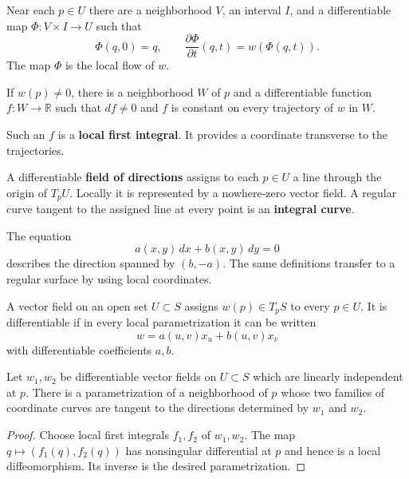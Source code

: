 \documentclass[12pt, oneside]{book}
\begin{document}
\begin{theorem}
    Near each $p\in U$ there are a neighborhood $V$, an interval $I$, and a
    differentiable map $\Phi:V\times I\rightarrow U$ such that
    \[
        \Phi(q,0)=q,
        \qquad
        \frac{\partial\Phi}{\partial t}(q,t)=w(\Phi(q,t)).
    \]
    The map $\Phi$ is the local flow of $w$.
\end{theorem}

\begin{lemma}
    If $w(p)\neq0$, there is a neighborhood $W$ of $p$ and a differentiable
    function $f:W\rightarrow\mathbb{R}$ such that $df\neq0$ and $f$ is
    constant on every trajectory of $w$ in $W$.
\end{lemma}

Such an $f$ is a \textbf{local first integral}.  It provides a coordinate
transverse to the trajectories.

\begin{definition}
    A differentiable \textbf{field of directions} assigns to each $p\in U$ a
    line through the origin of $T_pU$.  Locally it is represented by a
    nowhere-zero vector field.  A regular curve tangent to the assigned line
    at every point is an \textbf{integral curve}.
\end{definition}

The equation
\[
    a(x,y)\,dx+b(x,y)\,dy=0
\]
describes the direction spanned by $(b,-a)$.  The same definitions transfer
to a regular surface by using local coordinates.

\begin{definition}
    A vector field on an open set $U\subset S$ assigns
    $w(p)\in T_pS$ to every $p\in U$.  It is differentiable if in every local
    parametrization it can be written
    \[
        w=a(u,v)x_u+b(u,v)x_v
    \]
    with differentiable coefficients $a,b$.
\end{definition}

\begin{theorem}
    Let $w_1,w_2$ be differentiable vector fields on $U\subset S$ which are
    linearly independent at $p$.  There is a parametrization of a neighborhood
    of $p$ whose two families of coordinate curves are tangent to the
    directions determined by $w_1$ and $w_2$.
\end{theorem}

\begin{proof}
    Choose local first integrals $f_1,f_2$ of $w_1,w_2$.  The map
    $q\mapsto(f_1(q),f_2(q))$ has nonsingular differential at $p$ and hence is
    a local diffeomorphism.  Its inverse is the desired parametrization.
\end{proof}
\end{document}
